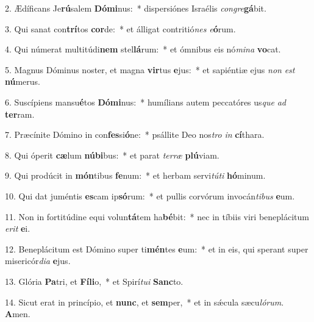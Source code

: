 2. Ædíficans Je\textbf{rú}salem \textbf{Dó}\textbf{mi}nus:~*  dispersiónes Israélis \textit{con}\textit{gre}\textbf{gá}bit.\

3. Qui sanat con\textbf{trí}tos \textbf{cor}de:~*  et álligat contritió\textit{nes} \textit{e}\textbf{ó}rum.\

4. Qui númerat multitúdi\textbf{nem} stel\textbf{lá}rum:~*  et ómnibus eis nó\textit{mi}\textit{na} \textbf{vo}cat.\

5. Magnus Dóminus noster, et magna \textbf{vir}tus \textbf{e}jus:~*  et sapiéntiæ ejus \textit{non} \textit{est} \textbf{nú}merus.\

6. Suscípiens mansu\textbf{é}tos \textbf{Dó}\textbf{mi}nus:~*  humílians autem peccatóres us\textit{que} \textit{ad} \textbf{ter}ram.\

7. Præcínite Dómino in con\textbf{fes}si\textbf{ó}ne:~*  psállite Deo nos\textit{tro} \textit{in} \textbf{cí}thara.\

8. Qui óperit \textbf{cæ}lum \textbf{nú}\textbf{bi}bus:~*  et parat \textit{ter}\textit{ræ} \textbf{plú}viam.\

9. Qui prodúcit in \textbf{món}tibus \textbf{fe}num:~*  et herbam servi\textit{tú}\textit{ti} \textbf{hó}minum.\

10. Qui dat juméntis \textbf{es}cam ip\textbf{só}rum:~*  et pullis corvórum invocán\textit{ti}\textit{bus} \textbf{e}um.\

11. Non in fortitúdine equi volun\textbf{tá}tem ha\textbf{bé}bit:~*  nec in tíbiis viri beneplácitum \textit{e}\textit{rit} \textbf{e}i.\

12. Beneplácitum est Dómino super ti\textbf{mén}tes \textbf{e}um:~*  et in eis, qui sperant super misericór\textit{di}\textit{a} \textbf{e}jus.\

13. Glória \textbf{Pa}tri, et \textbf{Fí}\textbf{li}o,~*  et Spirí\textit{tu}\textit{i} \textbf{Sanc}to.\

14. Sicut erat in princípio, et \textbf{nunc}, et \textbf{sem}per,~*  et in sǽcula sæcu\textit{ló}\textit{rum}. \textbf{A}men.\

